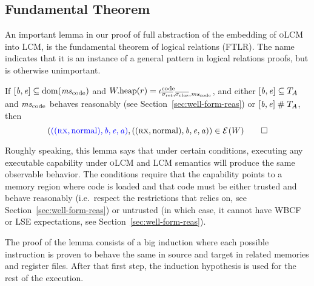 \documentclass[acmsmall,screen]{acmart}\settopmatter{}
\renewcommand{\npair}[2][n]{#2}
\renewcommand{\lre}[1][]{\typesetlr{E}^{#1}}
\renewcommand{\codereg}[2][\mathrm{code}]{\iota^{#1}_{#2}}
\newcommand{\trgcm}{\textsc{LCM}}
\newcommand{\srccm}{\textsc{oLCM}}
\begin{document}
\subsection{Fundamental Theorem}
An important lemma in our proof of full abstraction of the embedding of \srccm{} into \trgcm{}, is the fundamental theorem of logical relations (FTLR).
The name indicates that it is an instance of a general pattern in logical relations proofs, but is otherwise unimportant.
\begin{lemma}
  \label{thm:ftlr}
  If $[\baddr,\eaddr] \subseteq \dom(\mscode)$ and $\pwheap(r) = \codereg{\sigrets,\sigcloss,\mscode}$, and either $[\mathit{b},\mathit{e}] \subseteq T_{A}$ and $\mscode$ behaves reasonably (see Section~\ref{sec:well-form-reas}) or
$[\mathit{b},\mathit{e}] \mathrel{\#} T_{A}$,
then 
  \[
    \npair{\left(\src{((\rx,\normal),\baddr,\eaddr,\aaddr)}, ((\rx,\normal),\baddr,\eaddr,\aaddr)\right)} \in \lre(W) \qedhere
  \]
\end{lemma}

Roughly speaking, this lemma says that under certain conditions, executing any executable capability under \srccm{} and \trgcm{} semantics will produce the same observable behavior.
The conditions require that the capability points to a memory region where code is loaded and that code must be either trusted and behave reasonably (i.e.\ respect the restrictions that \stktokens{} relies on, see Section~\ref{sec:well-form-reas}) or untrusted (in which case, it cannot have WBCF or LSE expectations, see Section~\ref{sec:well-form-reas}).

The proof of the lemma consists of a big induction where each possible instruction is proven to behave the same in source and target in related memories and register files.
After that first step, the induction hypothesis is used for the rest of the execution.
\end{document}
